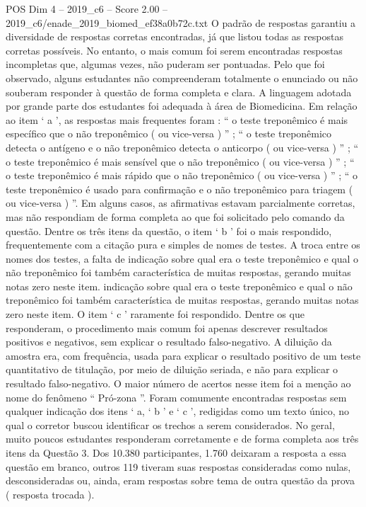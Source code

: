 \begin{textsample}{POS Dim 4 – 2019\_c6 – Score 2.00 – 2019\_c6/enade\_2019\_biomed\_ef38a0b72c.txt}
O padrão de respostas garantiu a diversidade de respostas corretas encontradas, já que listou todas as respostas corretas possíveis.
No entanto, o mais comum foi serem encontradas respostas incompletas que, algumas vezes, não puderam ser pontuadas.
Pelo que foi observado, alguns estudantes não compreenderam totalmente o enunciado ou não souberam responder à questão de forma completa e clara.
A linguagem adotada por grande parte dos estudantes foi adequada à área de Biomedicina.
Em relação ao item ‘ a ’, as respostas mais frequentes foram : “ o teste treponêmico é mais específico que o não treponêmico ( ou vice-versa ) ” ; “ o teste treponêmico detecta o antígeno e o não treponêmico detecta o anticorpo ( ou vice-versa ) ” ; “ o teste treponêmico é mais sensível que o não treponêmico ( ou vice-versa ) ” ; “ o teste treponêmico é mais rápido que o não treponêmico ( ou vice-versa ) ” ; “ o teste treponêmico é usado para confirmação e o não treponêmico para triagem ( ou vice-versa ) ”.
Em alguns casos, as afirmativas estavam parcialmente corretas, mas não respondiam de forma completa ao que foi solicitado pelo comando da questão.
Dentre os três itens da questão, o item ‘ b ’ foi o mais respondido, frequentemente com a citação pura e simples de nomes de testes.
A troca entre os nomes dos testes, a falta de indicação sobre qual era o teste treponêmico e qual o não treponêmico foi também característica de muitas respostas, gerando muitas notas zero neste item. indicação sobre qual era o teste treponêmico e qual o não treponêmico foi também característica de muitas respostas, gerando muitas notas zero neste item.
O item ‘ c ’ raramente foi respondido.
Dentre os que responderam, o procedimento mais comum foi apenas descrever resultados positivos e negativos, sem explicar o resultado falso-negativo.
A diluição da amostra era, com frequência, usada para explicar o resultado positivo de um teste quantitativo de titulação, por meio de diluição seriada, e não para explicar o resultado falso-negativo.
O maior número de acertos nesse item foi a menção ao nome do fenômeno “ Pró-zona ”.
Foram comumente encontradas respostas sem qualquer indicação dos itens ‘ a, ‘ b ’ e ‘ c ’, redigidas como um texto único, no qual o corretor buscou identificar os trechos a serem considerados.
No geral, muito poucos estudantes responderam corretamente e de forma completa aos três itens da Questão 3.
Dos 10.380 participantes, 1.760 deixaram a resposta a essa questão em branco, outros 119 tiveram suas respostas consideradas como nulas, desconsideradas ou, ainda, eram respostas sobre tema de outra questão da prova ( resposta trocada ).

\end{textsample}
